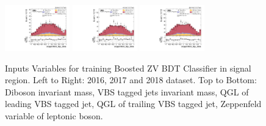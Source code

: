 \begin{figure}[!ht]
  \includegraphics[width=0.25\textwidth]{analysis_plots/2016_zv/sr_l/zeppenfeld_lep_deta.pdf} \hspace{-12pt}
  \includegraphics[width=0.25\textwidth]{analysis_plots/2017_zv/sr_l/zeppenfeld_lep_deta.pdf} \hspace{-12pt}
  \includegraphics[width=0.25\textwidth]{analysis_plots/2018_zv/sr_l/zeppenfeld_lep_deta.pdf} \hspace{-12pt} \\ \vspace{-5pt}
  \caption[Inputs Variables for training Boosted ZV BDT Classifier in signal region.]%
  {Inputs Variables for training Boosted ZV BDT Classifier in signal region.
    Left to Right: 2016, 2017 and 2018 dataset.
    Top to Bottom: Diboson invariant mass, VBS tagged jets invariant mass, QGL of leading
    VBS tagged jet, QGL of trailing VBS tagged jet, Zeppenfeld variable of leptonic boson.}%
  \label{fig:vbs-training-input-zv-sr}
\end{figure}


